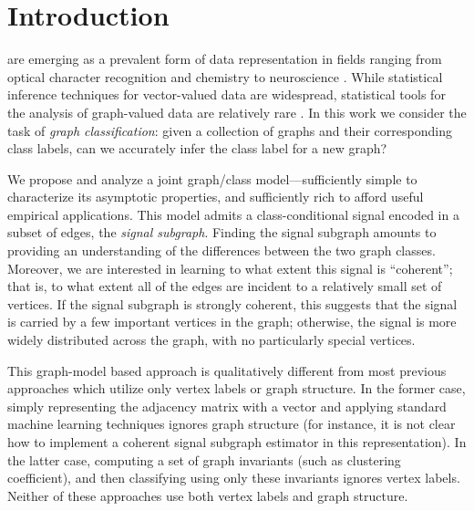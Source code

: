 \documentclass[10pt,journal,cspaper,compsoc]{IEEEtran}
\begin{document}
\maketitle
\IEEEdisplaynotcompsoctitleabstractindextext
\IEEEpeerreviewmaketitle



\section{Introduction}

 are emerging as a prevalent form of data representation in fields ranging from optical character recognition and chemistry \cite{Bunke2011} to neuroscience \cite{Hagmann2010}.  While statistical inference techniques for vector-valued data are widespread, statistical tools for the analysis of graph-valued data are relatively rare \cite{Bunke2011}. In this work we consider the task of \emph{graph classification}: given a collection of graphs and their corresponding class labels, can we accurately infer the class label for a new graph?  

We propose and analyze a joint graph/class model---sufficiently simple to characterize its asymptotic properties, and sufficiently rich to afford useful empirical applications.  This model admits a class-conditional signal encoded in a subset of edges, the \emph{signal subgraph}. Finding the signal subgraph amounts to providing an understanding of the differences between the two graph classes.  Moreover, we are interested in learning to what extent this signal is ``coherent''; that is, to what extent all of the edges are incident to a relatively small set of vertices. If the signal subgraph is strongly coherent, this suggests that the signal is carried by a few important vertices in the graph; otherwise, the signal is more widely distributed across the graph, with no particularly special vertices. 

This graph-model based approach is qualitatively different from most previous approaches which utilize only vertex labels or graph structure.  In the former case, simply representing the adjacency matrix with a vector and applying standard machine learning techniques ignores graph structure (for instance, it is not clear how to implement a coherent signal subgraph estimator in this representation).  In the latter case, computing a set of graph invariants (such as clustering coefficient), and then classifying using only these invariants ignores vertex labels.  Neither of these approaches use both vertex labels and graph structure.  
\end{document}
